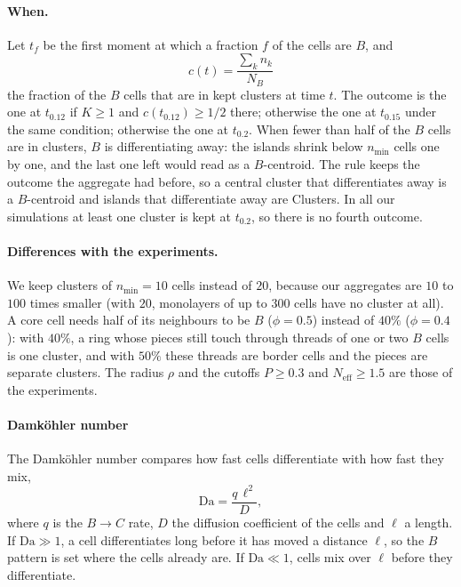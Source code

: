 \documentclass{article}
\begin{document}
\paragraph{When.} 

    Let $t_f$ be the first moment at which a fraction $f$ of the cells are $B$, and
    \begin{equation*}
        c(t) = \frac{\sum_{k} n_k}{N_B}
    \end{equation*}
    the fraction of the $B$ cells that are in kept clusters at time $t$. The outcome is the one at $t_{0.12}$ if $K \ge 1$ and $c(t_{0.12}) \ge 1/2$ there; otherwise the one at $t_{0.15}$ under the same condition; otherwise the one at $t_{0.2}$. When fewer than half of the $B$ cells are in clusters, $B$ is differentiating away: the islands shrink below $n_\text{min}$ cells one by one, and the last one left would read as a $B$-centroid. The rule keeps the outcome the aggregate had before, so a central cluster that differentiates away is a $B$-centroid and islands that differentiate away are Clusters. In all our simulations at least one cluster is kept at $t_{0.2}$, so there is no fourth outcome.

\paragraph{Differences with the experiments.} 

    We keep clusters of $n_\text{min} = 10$ cells instead of $20$, because our aggregates are $10$ to $100$ times smaller (with $20$, monolayers of up to $300$ cells have no cluster at all). A core cell needs half of its neighbours to be $B$ ($\phi = 0.5$) instead of $40\%$ ($\phi = 0.4$): with $40\%$, a ring whose pieces still touch through threads of one or two $B$ cells is one cluster, and with $50\%$ these threads are border cells and the pieces are separate clusters. The radius $\rho$ and the cutoffs $P \ge 0.3$ and $N_\text{eff} \ge 1.5$ are those of the experiments.

\paragraph{Damköhler number}

    The Damköhler number compares how fast cells differentiate with how fast they mix,
    \begin{equation*}
        \mathrm{Da} = \frac{q\,\ell^2}{D},
    \end{equation*}
    where $q$ is the $B\to C$ rate, $D$ the diffusion coefficient of the cells and $\ell$ a length. If $\mathrm{Da}\gg1$, a cell differentiates long before it has moved a distance $\ell$, so the $B$ pattern is set where the cells already are. If $\mathrm{Da}\ll1$, cells mix over $\ell$ before they differentiate.
\end{document}
